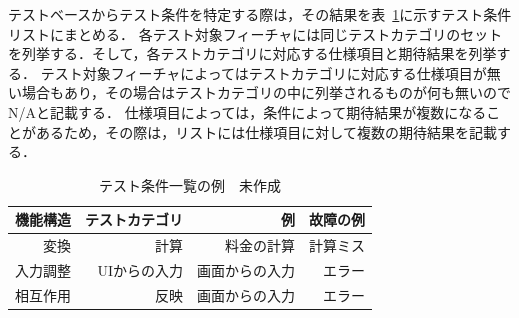 \documentclass[a4paper,11pt]{jreport}
\begin{document}
テストベースからテスト条件を特定する際は，その結果を表~\ref{tbl:D-3-tbl2}に示すテスト条件リストにまとめる．
各テスト対象フィーチャには同じテストカテゴリのセットを列挙する．そして，各テストカテゴリに対応する仕様項目と期待結果を列挙する．
 テスト対象フィーチャによってはテストカテゴリに対応する仕様項目が無い場合もあり，その場合はテストカテゴリの中に列挙されるものが何も無いのでN/Aと記載する．
仕様項目によっては，条件によって期待結果が複数になることがあるため，その際は，リストには仕様項目に対して複数の期待結果を記載する．

\begin{table}[t]
\caption{テスト条件一覧の例　未作成}
\label{tbl:D-3-tbl2}
\begin{center}
\begin{tabular}{r|r|r|r}
機能構造&テストカテゴリ&例&故障の例\\
\hline
\hline
変換&計算&料金の計算&計算ミス\\
\hline
入力調整&UIからの入力&画面からの入力&エラー\\
\hline
相互作用&反映&画面からの入力&エラー\\
    \hline
\end{tabular}%
\end{center}
\end{table}
\end{document}
